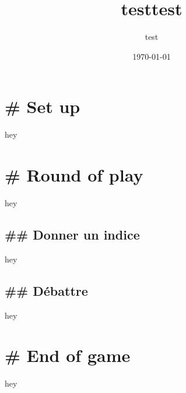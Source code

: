 \documentclass{article}%
\title{testtest}%
\author{test}%
\date{\today}%
\begin{document}
%
\pagestyle{empty}%
\normalsize%
\maketitle%
\section{\# Set up
}%
\label{sec:Setup}%
hey

%
\section{\# Round of play
}%
\label{sec:Roundofplay}%
hey

%
\subsection{\#\# Donner un indice
}%
\label{subsec:Donnerunindice}%
hey

%
\subsection{\#\# Débattre
}%
\label{subsec:Dbattre}%
hey

%
\section{\# End of game
}%
\label{sec:Endofgame}%
hey

%
\end{document}
